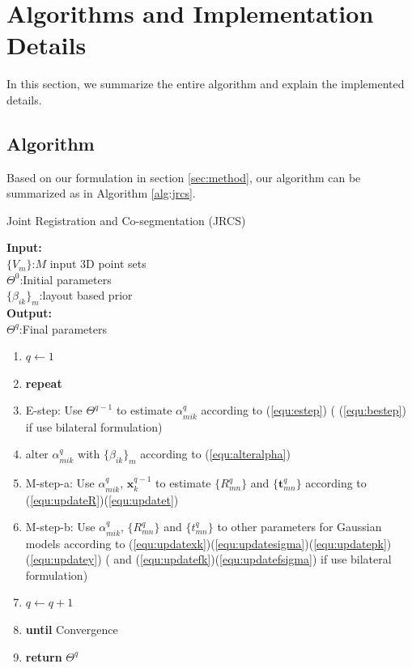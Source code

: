 \section{Algorithms and Implementation Details}
\label{sec:imp}
In this section, we summarize the entire algorithm and explain the implemented details.\\ 
\subsection{Algorithm}
Based on our formulation in section \ref{sec:method}, our algorithm can be summarized as in Algorithm \ref{alg:jrcs}.
\begin{algorithm}[htb]
	\caption{Joint Registration and Co-segmentation (JRCS)}
	\label{alg:jrcs}
	\textbf{Input:}~~\\
	$\{V_m\}$:$M$ input 3D point sets\\
	$\Theta^0$:Initial parameters~~\\
	$\{\beta_{ik}\}_{m}$:layout based prior\\
	\textbf{Output:}~~\\
	$\Theta^q$:Final parameters~~
	\begin{enumerate}
		\item $q\leftarrow1$
		\item \textbf{repeat}
		\item E-step: Use $\Theta^{q-1}$ to estimate $\alpha_{mik}^q$ according to (\ref{equ:estep}) ( (\ref{equ:bestep}) if use bilateral formulation)
		\item alter $\alpha_{mik}^q$ with $\{\beta_{ik}\}_{m}$ according to (\ref{equ:alteralpha})
		\item M-step-a: Use $\alpha^q_{mik}$, $\pmb x^{q-1}_k$ to estimate $\{R_{mn}^q\}$ and $\{\pmb t_{mn}^q\}$ according to (\ref{equ:updateR})(\ref{equ:updatet})
		\item M-step-b: Use $\alpha^q_{mik}$, $\{R_{mn}^q\}$ and $\{t_{mn}^q\}$ to other parameters for Gaussian models according to (\ref{equ:updatexk})(\ref{equ:updatesigma})(\ref{equ:updatepk})(\ref{equ:updatey})  ( and (\ref{equ:updatefk})(\ref{equ:updatefsigma}) if use bilateral formulation)
		\item $q \leftarrow q+1$
		\item \textbf{until} Convergence
		\item \textbf{return} $\Theta^q$
	\end{enumerate}
\end{algorithm}
